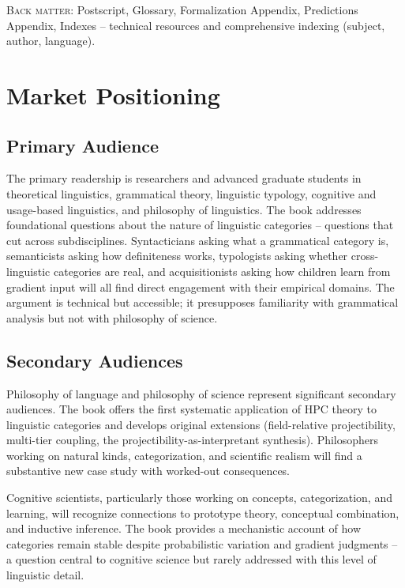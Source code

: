 \documentclass[11pt]{book}
\newcommand{\labelsc}[1]{{\mdseries\textsc{#1}}}
\begin{document}
\labelsc{Back matter:} Postscript, Glossary, Formalization Appendix, Predictions Appendix, Indexes -- technical resources and comprehensive indexing (subject, author, language).

\section{Market Positioning}

\subsection*{Primary Audience}

The primary readership is researchers and advanced graduate students in theoretical linguistics, grammatical theory, linguistic typology, cognitive and usage-based linguistics, and philosophy of linguistics. The book addresses foundational questions about the nature of linguistic categories -- questions that cut across subdisciplines. Syntacticians asking what a grammatical category is, semanticists asking how definiteness works, typologists asking whether cross-linguistic categories are real, and acquisitionists asking how children learn from gradient input will all find direct engagement with their empirical domains. The argument is technical but accessible; it presupposes familiarity with grammatical analysis but not with philosophy of science.

\subsection*{Secondary Audiences}

Philosophy of language and philosophy of science represent significant secondary audiences. The book offers the first systematic application of HPC theory to linguistic categories and develops original extensions (field-relative projectibility, multi-tier coupling, the projectibility-as-interpretant synthesis). Philosophers working on natural kinds, categorization, and scientific realism will find a substantive new case study with worked-out consequences.

Cognitive scientists, particularly those working on concepts, categorization, and learning, will recognize connections to prototype theory, conceptual combination, and inductive inference. The book provides a mechanistic account of how categories remain stable despite probabilistic variation and gradient judgments -- a question central to cognitive science but rarely addressed with this level of linguistic detail.
\end{document}
